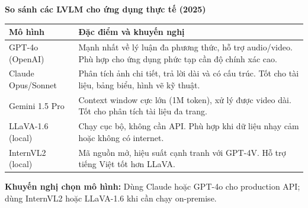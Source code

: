 \begin{mdframed}[style=infobox]
\textbf{So sánh các LVLM cho ứng dụng thực tế (2025)}

\begin{tabular}{lp{8.5cm}}
\hline
\textbf{Mô hình} & \textbf{Đặc điểm và khuyến nghị} \\
\hline
GPT-4o (OpenAI) & Mạnh nhất về lý luận đa phương thức, hỗ trợ audio/video. Phù hợp cho ứng dụng phức tạp cần độ chính xác cao. \\
Claude Opus/Sonnet & Phân tích ảnh chi tiết, trả lời dài và có cấu trúc. Tốt cho tài liệu, bảng biểu, hình vẽ kỹ thuật. \\
Gemini 1.5 Pro & Context window cực lớn (1M token), xử lý được video dài. Tốt cho phân tích tài liệu đa trang. \\
LLaVA-1.6 (local) & Chạy cục bộ, không cần API. Phù hợp khi dữ liệu nhạy cảm hoặc không có internet. \\
InternVL2 (local) & Mã nguồn mở, hiệu suất cạnh tranh với GPT-4V. Hỗ trợ tiếng Việt tốt hơn LLaVA. \\
\hline
\end{tabular}

\vspace{6pt}
\textbf{Khuyến nghị chọn mô hình:} Dùng Claude hoặc GPT-4o cho production API; dùng InternVL2 hoặc LLaVA-1.6 khi cần chạy on-premise.
\end{mdframed}
